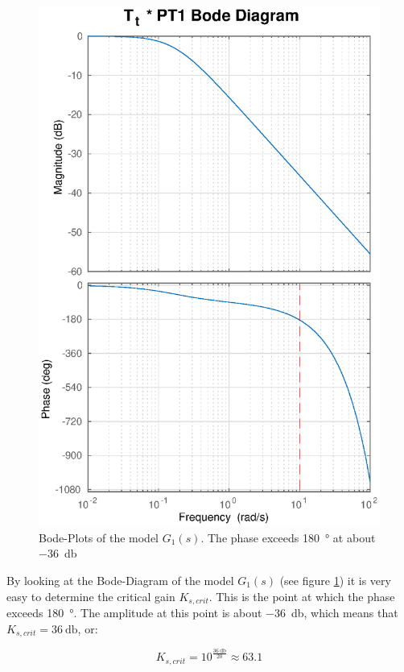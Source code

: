 \begin{figure}[t]
    \centering
    \includegraphics[width=\imagewidth]{images/Tt_PT1_bode}
    \caption{Bode-Plots of the model $G_1(s)$. The phase exceeds \SI{180}{\degree} at about \SI{-36}{\decibel}}
    \label{fig:Tt_PT1_bode}
\end{figure}

By  looking  at  the  Bode-Diagram  of  the   model   $G_1(s)$   (see   figure
\ref{fig:Tt_PT1_bode})  it  is  very  easy  to  determine  the  critical  gain
$K_{s,crit}$. This is the  point at which the phase exceeds \SI{180}{\degree}.
The amplitude at  this  point  is  about  \SI{-36}{\decibel}, which means that
$K_{s,crit}=\SI{36}{\decibel}$, or:

\begin{equation}
    K_{s,crit} = 10^{\frac{\SI{36}{\decibel}}{20}} \approx 63.1
\end{equation}

